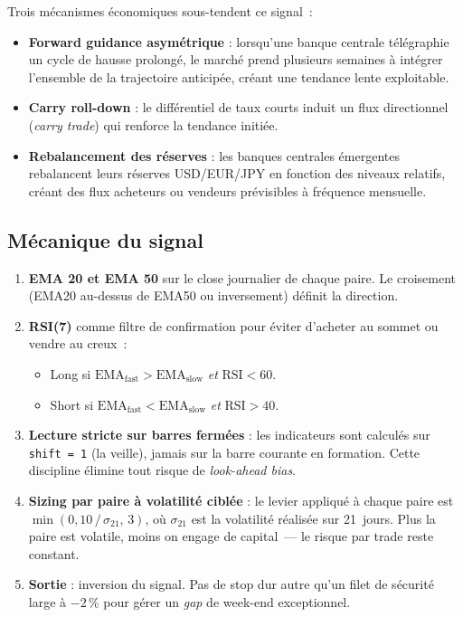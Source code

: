 \documentclass[11pt, a4paper]{scrartcl}
\begin{document}
Trois mécanismes économiques sous-tendent ce signal~:

\begin{itemize}
\item \textbf{Forward guidance asymétrique} : lorsqu'une banque centrale télégraphie un cycle de hausse prolongé, le marché prend plusieurs semaines à intégrer l'ensemble de la trajectoire anticipée, créant une tendance lente exploitable.
\item \textbf{Carry roll-down} : le différentiel de taux courts induit un flux directionnel (\emph{carry trade}) qui renforce la tendance initiée.
\item \textbf{Rebalancement des réserves} : les banques centrales émergentes rebalancent leurs réserves USD/EUR/JPY en fonction des niveaux relatifs, créant des flux acheteurs ou vendeurs prévisibles à fréquence mensuelle.
\end{itemize}

\subsection{Mécanique du signal}

\begin{enumerate}
\item \textbf{EMA 20 et EMA 50} sur le close journalier de chaque paire. Le croisement (EMA20 au-dessus de EMA50 ou inversement) définit la direction.
\item \textbf{RSI(7)} comme filtre de confirmation pour éviter d'acheter au sommet ou vendre au creux~:
  \begin{itemize}
  \item Long si $\mathrm{EMA}_{\mathrm{fast}} > \mathrm{EMA}_{\mathrm{slow}}$ \emph{et} $\mathrm{RSI} < 60$.
  \item Short si $\mathrm{EMA}_{\mathrm{fast}} < \mathrm{EMA}_{\mathrm{slow}}$ \emph{et} $\mathrm{RSI} > 40$.
  \end{itemize}
\item \textbf{Lecture stricte sur barres fermées} : les indicateurs sont calculés sur \texttt{shift~=~1} (la veille), jamais sur la barre courante en formation. Cette discipline élimine tout risque de \emph{look-ahead bias}.
\item \textbf{Sizing par paire à volatilité ciblée} : le levier appliqué à chaque paire est $\min(0{,}10\,/\,\sigma_{21},\,3)$, où $\sigma_{21}$ est la volatilité réalisée sur 21~jours. Plus la paire est volatile, moins on engage de capital~--- le risque par trade reste constant.
\item \textbf{Sortie} : inversion du signal. Pas de stop dur autre qu'un filet de sécurité large à $-2\,\%$ pour gérer un \emph{gap} de week-end exceptionnel.
\end{enumerate}
\end{document}
